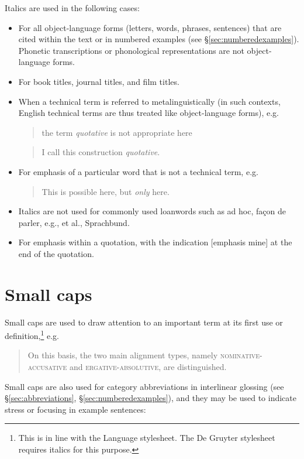 \documentclass[a4paper]{article}
\newcommand{\sectref}[1]{§\ref{#1}}
\newenvironment{gsrexq}{\begin{quote}\color{blue}}{\end{quote}}
\newcommand{\gsrex}[1]{{\color{blue}#1}}
\begin{document}
Italics are used in the following cases:
\begin{itemize}
\item For all object-language forms (letters, words, phrases, sentences) that are cited within the text or in numbered examples (see \sectref{sec:numberedexamples}). Phonetic transcriptions or phonological representations are not object-language forms.
\item For book titles, journal titles, and film titles.
\item When a technical term is referred to metalinguistically (in such contexts, English technical terms are thus treated like object-language forms), e.g.
  \begin{gsrexq}
    the term \textit{quotative} is not appropriate here
  \end{gsrexq} 
  \begin{gsrexq}
    I call this construction \textit{quotative}.
  \end{gsrexq}
\item For emphasis of a particular word that is not a technical term, e.g.
  \begin{gsrexq}
    This is possible here, but \textit{only} here.
  \end{gsrexq} 
\item Italics are not used for commonly used loanwords such as \gsrex{ad hoc}, \gsrex{façon de parler}, \gsrex{e.g.}, \gsrex{et al.}, \gsrex{Sprachbund}.
\item For emphasis within a quotation, with the indication [emphasis mine] at the end of the quotation.
\end{itemize}


\section{Small caps}\label{sec:small-caps}

Small caps are used to draw attention to an important term at its first
use or definition,\footnote{This is in line with the Language stylesheet.
The De Gruyter stylesheet requires italics for this purpose.} e.g.

\begin{gsrexq}
On this basis, the two main alignment types, namely 
\textsc{nominative-accusative}
and 
\textsc{ergative-absolutive}, 
are distinguished. 
\end{gsrexq}

Small caps are also used
for category abbreviations in interlinear glossing (see \sectref{sec:abbreviations}, \sectref{sec:numberedexamples}), and
they may be used to indicate stress or focusing in example sentences:
\end{document}
